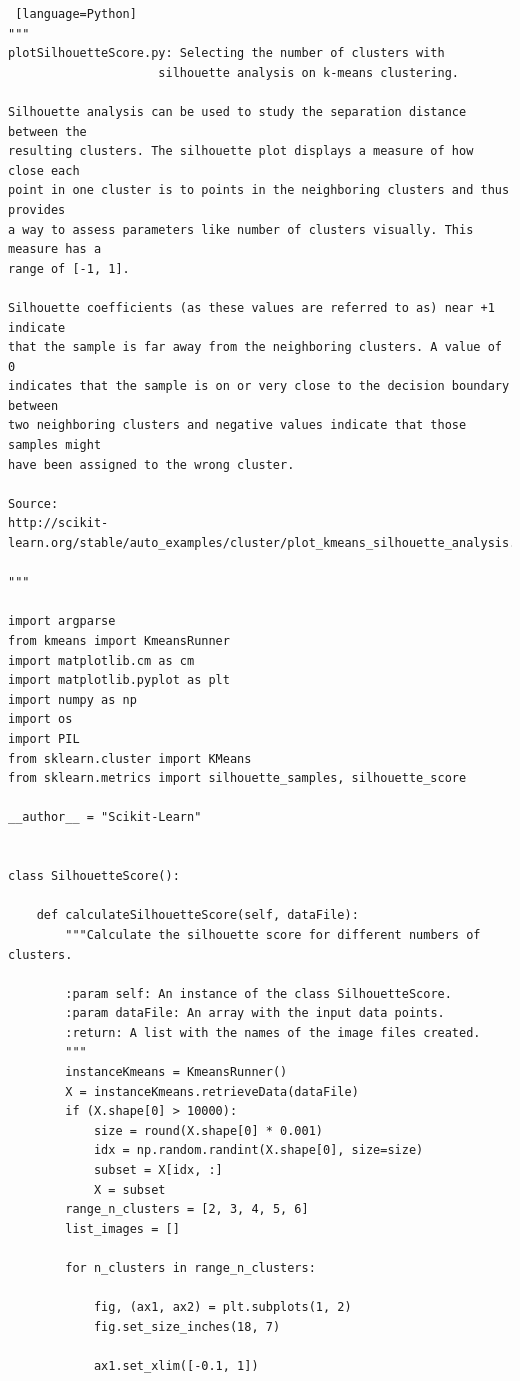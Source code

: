 \documentclass[11pt]{article}
\begin{document}
\begin{lstlisting} [language=Python]
"""
plotSilhouetteScore.py: Selecting the number of clusters with
                     silhouette analysis on k-means clustering.

Silhouette analysis can be used to study the separation distance between the
resulting clusters. The silhouette plot displays a measure of how close each
point in one cluster is to points in the neighboring clusters and thus provides
a way to assess parameters like number of clusters visually. This measure has a
range of [-1, 1].

Silhouette coefficients (as these values are referred to as) near +1 indicate
that the sample is far away from the neighboring clusters. A value of 0
indicates that the sample is on or very close to the decision boundary between
two neighboring clusters and negative values indicate that those samples might
have been assigned to the wrong cluster.

Source:
http://scikit-learn.org/stable/auto_examples/cluster/plot_kmeans_silhouette_analysis.html

"""

import argparse
from kmeans import KmeansRunner
import matplotlib.cm as cm
import matplotlib.pyplot as plt
import numpy as np
import os
import PIL
from sklearn.cluster import KMeans
from sklearn.metrics import silhouette_samples, silhouette_score

__author__ = "Scikit-Learn"


class SilhouetteScore():

    def calculateSilhouetteScore(self, dataFile):
        """Calculate the silhouette score for different numbers of clusters.

        :param self: An instance of the class SilhouetteScore.
        :param dataFile: An array with the input data points.
        :return: A list with the names of the image files created.
        """
        instanceKmeans = KmeansRunner()
        X = instanceKmeans.retrieveData(dataFile)
        if (X.shape[0] > 10000):
            size = round(X.shape[0] * 0.001)
            idx = np.random.randint(X.shape[0], size=size)
            subset = X[idx, :]
            X = subset
        range_n_clusters = [2, 3, 4, 5, 6]
        list_images = []

        for n_clusters in range_n_clusters:

            fig, (ax1, ax2) = plt.subplots(1, 2)
            fig.set_size_inches(18, 7)

            ax1.set_xlim([-0.1, 1])


\end{lstlisting}
\end{document}
